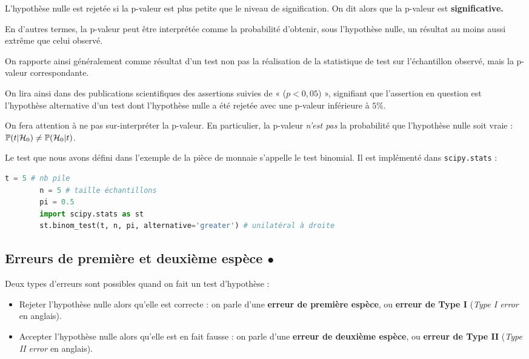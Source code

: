 L'hypothèse nulle est rejetée si la p-valeur est plus petite que le niveau de
signification. On dit alors que la p-valeur est \textbf{significative.}

En d'autres termes, la p-valeur peut être interprétée comme la probabilité
d'obtenir, sous l'hypothèse nulle, un résultat au moins aussi extrême que celui
observé.

On rapporte ainsi généralement comme résultat d'un test non pas la réalisation
de la statistique de test sur l'échantillon observé, mais la p-valeur
correspondante.

On lira ainsi dans des publications scientifiques des assertions suivies de «
($p < 0,05$) », signifiant que l'assertion en question est l'hypothèse
alternative d'un test dont l'hypothèse nulle a été rejetée avec une p-valeur
inférieure à $5\%.$

\begin{attention}
	On fera attention à ne pas sur-interpréter la p-valeur. En particulier, la
	p-valeur \textit{n'est pas} la probabilité que l'hypothèse nulle soit vraie :
	$\mathbb{P}(t|\mathcal{H}_0) \neq \mathbb{P}(\mathcal{H}_0|t)$.
\end{attention}

\begin{exemple}
	Le test que nous avons défini dans l'exemple de la pièce de monnaie s'appelle
	le test binomial. Il est implémenté dans \texttt{scipy.stats} :
	\begin{lstlisting}[language=Python]
		t = 5 # nb pile 
		n = 5 # taille échantillons 
		pi = 0.5 
		import scipy.stats as st 
		st.binom_test(t, n, pi, alternative='greater') # unilatéral à droite
	\end{lstlisting}
\end{exemple}



\subsection{Erreurs de première et deuxième espèce $\bullet$}
\label{sec:test_errors}
Deux types d'erreurs sont possibles quand on fait un test d'hypothèse :
\begin{itemize}
	\item Rejeter l'hypothèse nulle alors qu'elle est correcte : on parle d'une
	\textbf{erreur de première espèce}, ou \textbf{erreur de Type I}
	(\textit{Type I error} en anglais).
	\item Accepter l'hypothèse nulle alors qu'elle est en fait fausse : on parle
	d'une \textbf{erreur de deuxième espèce}, ou \textbf{erreur de Type II}
	(\textit{Type II error} en anglais).
\end{itemize}

